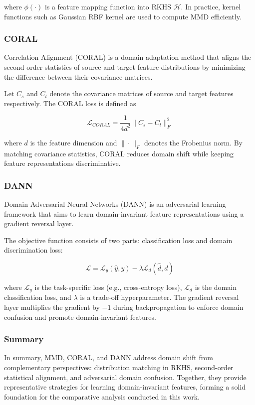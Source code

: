 \documentclass[a4paper,12pt]{extarticle}
\begin{document}
where $\phi(\cdot)$ is a feature mapping function into RKHS $\mathcal{H}$. In practice, kernel functions such as
Gaussian RBF kernel are used to compute MMD efficiently.

\subsubsection{CORAL}
Correlation Alignment (CORAL) is a domain adaptation method that aligns the second-order statistics of source and
target feature distributions by minimizing the difference between their covariance matrices.

Let $C_s$ and $C_t$ denote the covariance matrices of source and target features respectively. The CORAL loss is
defined as

\[
	\mathcal{L}_{CORAL}=\frac{1}{4d^2}\|C_s-C_t\|_F^2
\]

where $d$ is the feature dimension and $\|\cdot\|_F$ denotes the Frobenius norm. By matching covariance statistics,
CORAL reduces domain shift while keeping feature representations discriminative.

\subsubsection{DANN}
Domain-Adversarial Neural Networks (DANN) is an adversarial learning framework that aims to learn domain-invariant
feature representations using a gradient reversal layer.

The objective function consists of two parts: classification loss and domain discrimination loss:

\[
	\mathcal{L}=\mathcal{L}_y(\hat{y},y)-\lambda \mathcal{L}_d(\hat{d},d)
\]

where $\mathcal{L}_y$ is the task-specific loss (e.g., cross-entropy loss), $\mathcal{L}_d$ is the domain
classification loss, and $\lambda$ is a trade-off hyperparameter. The gradient reversal layer multiplies the gradient
by $-1$ during backpropagation to enforce domain confusion and promote domain-invariant features.

\subsubsection{Summary}
In summary, MMD, CORAL, and DANN address domain shift from complementary perspectives: distribution matching in RKHS,
second-order statistical alignment, and adversarial domain confusion. Together, they provide representative strategies
for learning domain-invariant features, forming a solid foundation for the comparative analysis conducted in this work.
\end{document}
